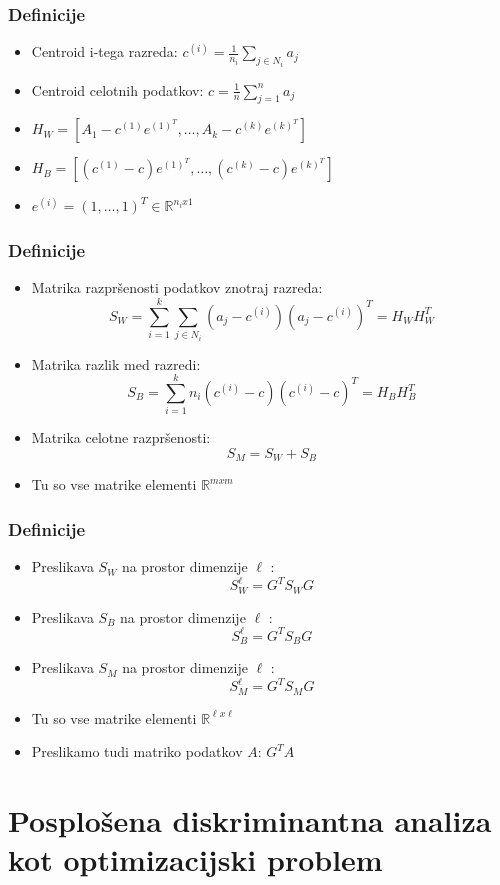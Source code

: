 \documentclass{beamer}
\begin{document}
\begin{frame}
\frametitle{Definicije}
\begin{itemize}
\item Centroid i-tega razreda: $c^{(i)} = \frac{1}{n_i} \sum_{j \in N_i} a_j$
\item Centroid celotnih podatkov: $c = \frac{1}{n} \sum_{j = 1}^{n} a_j$
\item $H_W = [A_1 - c^{(1)}e^{(1)^T}, \ldots, A_k - c^{(k)}e^{(k)^T}]$
\item $H_B = [(c^{(1)} - c)e^{(1)^T}, \ldots,(c^{(k)} - c) e^{(k)^T}]$
\item $e^{(i)} = (1,\ldots, 1) ^T \in \mathbb{R}^{ n_i x 1 }$
\end{itemize}
\end{frame}


\begin{frame}
\frametitle{Definicije}
\begin{itemize}
\item Matrika razpršenosti podatkov znotraj razreda: $$S_W = \sum_{i = 1}^{k} \sum_{j \in N_i}(a_j - c^{(i)})(a_j - c^{(i)})^T = H_W H_W^T$$
\item Matrika razlik med razredi: $$S_B = \sum_{i = 1}^{k} n_i ( c^{(i)} - c)( c^{(i)} - c)^T = H_B H_B^T$$
\item Matrika celotne razpršenosti: $$S_M = S_W + S_B$$
\item Tu so vse matrike elementi $\mathbb{R}^{mxm}$
\end{itemize}
\end{frame}


\begin{frame}
\frametitle{Definicije}
\begin{itemize}
\item Preslikava $S_W$ na prostor dimenzije $\ell$ : $$ S_{W}^{\ell} = G^T S_W G$$
\item Preslikava $S_B$ na prostor dimenzije $\ell$ : $$ S_{B}^{\ell} = G^T S_B G$$
\item Preslikava $S_M$ na prostor dimenzije $\ell$ : $$ S_{M}^{\ell} = G^T S_M G$$
\item Tu so vse matrike elementi $\mathbb{R}^{ \ell x \ell } $
\item Preslikamo tudi matriko podatkov $A$: $G^T A$
\end{itemize}
\end{frame}



\section{Posplošena diskriminantna analiza kot optimizacijski problem}
\end{document}
